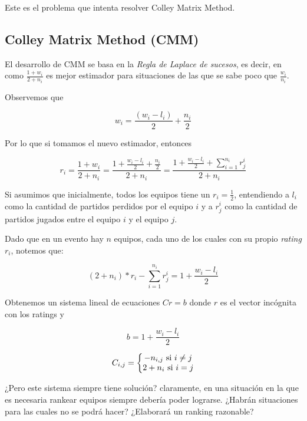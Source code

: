 Este es el problema que intenta resolver Colley Matrix Method.

\subsection{Colley Matrix Method (CMM)}

El desarrollo de CMM se basa en la \textit{Regla de Laplace de sucesos}, es decir, en como $\frac{1 + w_i}{2 + n_i}$ es mejor estimador para situaciones de las que se sabe poco que $\frac{w_i}{n_i}$.

Observemos que

\begin{equation}
    w_i = \frac{(w_i - l_i)}{2} + \frac{n_i}{2}
\end{equation}

Por lo que si tomamos el nuevo estimador, entonces

\begin{equation}
    r_i = \frac{1 + w_i}{2 + n_i} = \frac{1 + \frac{w_i - l_i}{2} + \frac{n_i}{2}}{2 + n_i} = \frac{1 + \frac{w_i - l_i}{2} + \sum_{i=1}^{n_i}{r_j^i}}{2 + n_i}
\end{equation}

Si asumimos que inicialmente, todos los equipos tiene un $r_i = \frac{1}{2}$, entendiendo a $l_i$ como la cantidad de partidos perdidos por el equipo $i$ y a $r_j^i$ como la cantidad de partidos jugados entre el equipo $i$ y el equipo $j$.

Dado que en un evento hay $n$ equipos, cada uno de los cuales con su propio \textit{rating} $r_i$, notemos que:

\begin{equation}
    (2 + n_i) * r_i - \sum_{i = 1}^{n_i} r_j^i = 1 + \frac{w_i - l_i}{2}
\end{equation}

Obtenemos un sistema lineal de ecuaciones $C r = b$ donde $r$ es el vector incógnita con los ratings y

\begin{equation}
    b = 1 + \frac{w_i - l_i}{2}
\end{equation}

\begin{equation}
    C_{i, j} = \left\lbrace\begin{matrix} 
        -n_{i, j} $ si $ i\neq j\\
        2 + n_i $ si $ i = j\\
    \end{matrix}\right. 
\end{equation}

¿Pero este sistema siempre tiene solución? claramente, en una situación en la que es necesaria rankear equipos siempre debería poder lograrse. ¿Habrán situaciones para las cuales no se podrá hacer? ¿Elaborará un ranking razonable?
